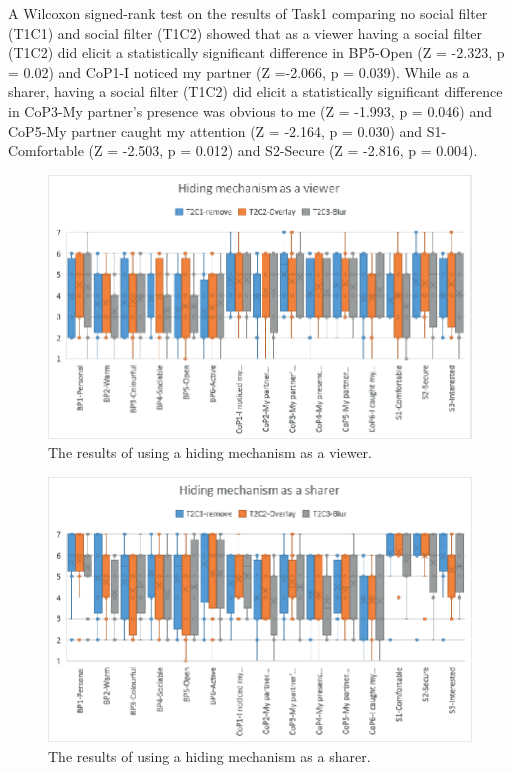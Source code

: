 A Wilcoxon signed-rank test on the results of Task1 comparing no social filter (T1C1) and social filter (T1C2) showed that as a viewer having a social filter (T1C2) did elicit a statistically significant difference in BP5-Open (Z = -2.323, p = 0.02) and CoP1-I noticed my partner (Z =-2.066, p = 0.039). While as a sharer, having a social filter (T1C2) did elicit a statistically significant difference in CoP3-My partner's presence was obvious to me (Z = -1.993, p = 0.046) and CoP5-My partner caught my attention (Z = -2.164, p = 0.030) and S1-Comfortable (Z = -2.503, p = 0.012) and S2-Secure (Z = -2.816, p = 0.004).

\begin{figure}
\begin{center}
\includegraphics[width=0.9\linewidth]{images/frontier18/images-05.eps}
\caption{The results of using a hiding mechanism as a viewer.}\label{fig:frontier18:result-hiding-viewer}
\end{center}
\end{figure}

\begin{figure}
\begin{center}
\includegraphics[width=0.9\linewidth]{images/frontier18/images-06.eps}
\caption{The results of using a hiding mechanism as a sharer.}\label{fig:frontier18:result-hiding-sharer}
\end{center}
\end{figure}

